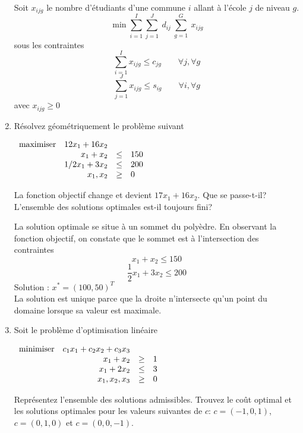 \begin{enumerate}
    \begin{solution}
      Soit $x_{ijg}$ le nombre d'étudiants d'une commune $i$ allant à l'école $j$ de niveau $g$.
      $$ \min \sum_{i=1}^I \sum_{j=1}^J~d_{ij}~\sum_{g=1}^G~x_{ijg} $$
      sous les contraintes
      $$ \sum_{i=1}^I x_{ijg} \le c_{jg} \qquad \forall j, \forall g$$
      $$ \sum_{j=1}^J x_{ijg} \le s_{ig} \qquad \forall i, \forall g$$
      avec $x_{ijg} \geq 0$
    \end{solution}


  \item Résolvez géométriquement le problème suivant

    $
    \begin{array}{lrcl}
      \mbox{maximiser} & 12 x_1+16 x_2\\
      & x_1 + x_2 & \leq & 150\\
      & 1/2 x_1 + 3x_2 & \leq & 200\\
      & x_1, x_2 & \geq & 0
    \end{array}
    $

    La fonction objectif change et devient $17 x_1+16 x_2$. Que se passe-t-il? L'ensemble des solutions optimales est-il toujours fini?
    \begin{solution}
      La solution optimale se situe à un sommet du polyèdre. En observant la fonction objectif, on constate que le sommet est à l'intersection des contraintes 
      $$ x_{1} + x_{2} \le 150$$
      $$ \frac{1}{2}x_{1} + 3x_{2} \le 200$$ 
      Solution : $x^{*} = (100,50)^{T}$\\
      \newline
      La solution est unique parce que la droite n'intersecte qu'un point du domaine lorsque sa valeur est maximale. 
    \end{solution}


  \item Soit le problème d'optimisation linéaire

    $
    \begin{array}{lrcr}
      \mbox{minimiser} & c_1 x_1 + c_2 x_2 + c_3 x_3\\
      & x_1 + x_2 & \geq & 1\\
      & x_1 + 2x_2 & \leq & 3\\
      & x_1, x_2, x_3 & \geq & 0
    \end{array}
    $

    Représentez l'ensemble des solutions admissibles. Trouvez le coût optimal et les solutions  optimales pour les
    valeurs suivantes de $c$: $c=(-1, 0, 1)$,
    $c=(0, 1, 0)$ et
    $c=(0, 0, -1)$.


\end{enumerate}
